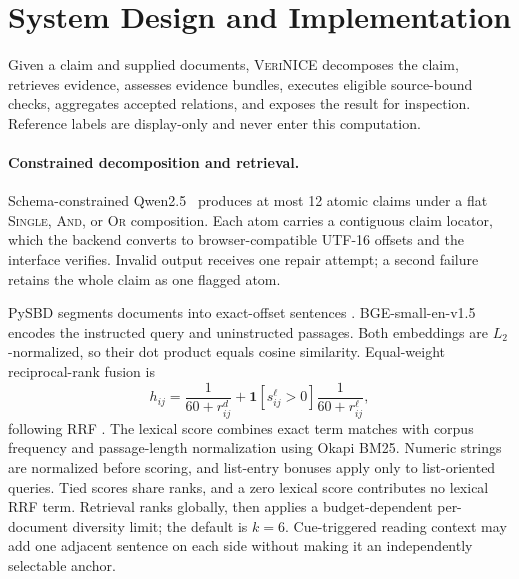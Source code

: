 \documentclass[letterpaper,twocolumn,10pt]{article}
\newcommand{\system}{\textsc{VeriNICE}}
\begin{document}
\section{System Design and Implementation}

Given a claim and supplied documents, \system{} decomposes the claim, retrieves
evidence, assesses evidence bundles, executes eligible source-bound checks,
aggregates accepted relations, and exposes the result for inspection. Reference
labels are display-only and never enter this computation.

\paragraph{Constrained decomposition and retrieval.}
Schema-constrained Qwen2.5~\cite{qwen-team-2024-qwen25} produces at most 12
atomic claims under a flat \textsc{Single}, \textsc{And}, or \textsc{Or}
composition. Each atom carries a contiguous claim locator, which the backend
converts to browser-compatible UTF-16 offsets and the interface verifies.
Invalid output receives one repair attempt; a second failure retains the whole
claim as one flagged atom.

PySBD segments documents into exact-offset sentences
\cite{sadvilkar-neumann-2020-pysbd}. BGE-small-en-v1.5
\cite{xiao-etal-2024-cpack} encodes the instructed query and uninstructed
passages. Both embeddings are $L_2$-normalized, so their dot product equals
cosine similarity. Equal-weight reciprocal-rank fusion is
\begin{equation}
h_{ij}=\frac{1}{60+r^d_{ij}}
    +\mathbf{1}[s^\ell_{ij}>0]\frac{1}{60+r^\ell_{ij}},
\label{eq:retrieval}
\end{equation}
following RRF \cite{cormack-etal-2009-rrf}. The lexical score combines exact
term matches with corpus frequency and passage-length normalization using
Okapi BM25. Numeric strings are normalized before scoring, and list-entry
bonuses apply only to list-oriented queries. Tied scores share ranks, and a
zero lexical score contributes no lexical RRF term. Retrieval
ranks globally, then applies a budget-dependent per-document diversity limit;
the default is $k=6$. Cue-triggered reading context may add one adjacent
sentence on each side without making it an independently selectable anchor.
\end{document}
